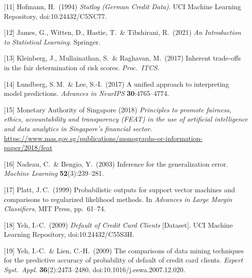 {[11] Hofmann, H.\ (1994) {\it Statlog (German Credit Data)}. UCI Machine Learning Repository, doi:10.24432/C5NC77.

[12] James, G., Witten, D., Hastie, T.\ \& Tibshirani, R.\ (2021) {\it An Introduction to Statistical Learning}. Springer.

[13] Kleinberg, J., Mullainathan, S.\ \& Raghavan, M.\ (2017) Inherent trade-offs in the fair determination of risk scores. {\it Proc.\ ITCS}.

[14] Lundberg, S.\,M.\ \& Lee, S.-I.\ (2017) A unified approach to interpreting model predictions. {\it Advances in NeurIPS} {\bf 30}:4765--4774.

[15] Monetary Authority of Singapore (2018) {\it Principles to promote fairness, ethics, accountability and transparency (FEAT) in the use of artificial intelligence and data analytics in Singapore's financial sector}. \url{https://www.mas.gov.sg/publications/monographs-or-information-paper/2018/feat}

[16] Nadeau, C.\ \& Bengio, Y.\ (2003) Inference for the generalization error. {\it Machine Learning} {\bf 52}(3):239--281.

[17] Platt, J.\,C.\ (1999) Probabilistic outputs for support vector machines and comparisons to regularized likelihood methods. In {\it Advances in Large Margin Classifiers}, MIT Press, pp.\ 61--74.

[18] Yeh, I.-C.\ (2009) {\it Default of Credit Card Clients} [Dataset]. UCI Machine Learning Repository, doi:10.24432/C55S3H.

[19] Yeh, I.-C.\ \& Lien, C.-H.\ (2009) The comparisons of data mining techniques for the predictive accuracy of probability of default of credit card clients. {\it Expert Syst.\ Appl.} {\bf 36}(2):2473--2480, doi:10.1016/j.eswa.2007.12.020.
\par}
